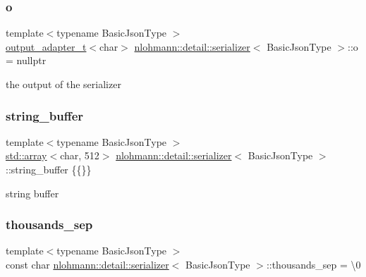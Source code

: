 \subsubsection{\texorpdfstring{o}{o}}
{\footnotesize\ttfamily template$<$typename Basic\+Json\+Type $>$ \\
\mbox{\hyperlink{namespacenlohmann_1_1detail_a9b680ddfb58f27eb53a67229447fc556}{output\+\_\+adapter\+\_\+t}}$<$char$>$ \mbox{\hyperlink{classnlohmann_1_1detail_1_1serializer}{nlohmann\+::detail\+::serializer}}$<$ Basic\+Json\+Type $>$\+::o = nullptr\hspace{0.3cm}{\ttfamily [private]}}



the output of the serializer 

\mbox{\label{classnlohmann_1_1detail_1_1serializer_a9c9b7ca63a66e59e5e7ffe8a2acf5c8f}} 
\subsubsection{\texorpdfstring{string\_buffer}{string\_buffer}}
{\footnotesize\ttfamily template$<$typename Basic\+Json\+Type $>$ \\
\mbox{\hyperlink{namespacenlohmann_1_1detail_a1ed8fc6239da25abcaf681d30ace4985af1f713c9e000f5d3f280adbd124df4f5}{std\+::array}}$<$char, 512$>$ \mbox{\hyperlink{classnlohmann_1_1detail_1_1serializer}{nlohmann\+::detail\+::serializer}}$<$ Basic\+Json\+Type $>$\+::string\+\_\+buffer \{\{\}\}\hspace{0.3cm}{\ttfamily [private]}}



string buffer 

\mbox{\label{classnlohmann_1_1detail_1_1serializer_a78a6ae833bb6cf7f00cb0d51db114b14}} 
\subsubsection{\texorpdfstring{thousands\_sep}{thousands\_sep}}
{\footnotesize\ttfamily template$<$typename Basic\+Json\+Type $>$ \\
const char \mbox{\hyperlink{classnlohmann_1_1detail_1_1serializer}{nlohmann\+::detail\+::serializer}}$<$ Basic\+Json\+Type $>$\+::thousands\+\_\+sep = \textquotesingle{}\textbackslash{}0\textquotesingle{}\hspace{0.3cm}{\ttfamily [private]}}



